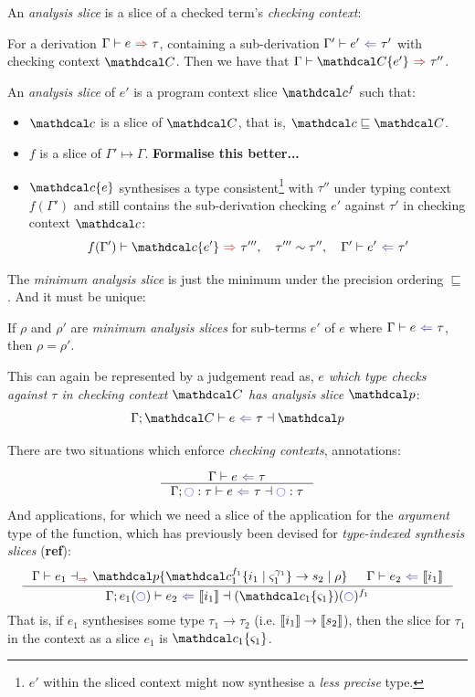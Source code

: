 An \textit{analysis slice} is a slice of a checked term's \textit{checking context}:
\begin{definition}\label{def:analysisslice}
For a derivation $\synthesis{e}{\tau}$, containing a sub-derivation $\analysis[\Gamma']{e'}{\tau'}$ with checking context $\C$. Then we have that $\synthesis[\Gamma]{\C\{e'\}}{\tau''}$. 

An \textit{analysis slice} of $e'$ is a program context slice $\Cs^f$ such that:
\begin{itemize}
\item $\Cs$ is a slice of $\C$, that is, $\Cs \sqsubseteq \C$.
\item $f$ is a slice of $\Gamma' \mapsto \Gamma$. \textbf{Formalise this better...}
\item $\Cs\{e\}$ synthesises a type consistent\footnote{$e'$ within the sliced context might now synthesise a \textit{less precise} type.} with $\tau''$ under typing context $f(\Gamma')$ and still contains the sub-derivation checking $e'$ against $\tau'$ in checking context $\Cs$:
\[\synthesis[f(\Gamma')]{\Cs\{e'\}}{\tau'''}, \quad \tau''' \sim \tau'', \quad \analysis[\Gamma']{e'}{\tau'}\]
\end{itemize}
\end{definition}

The \textit{minimum analysis slice} is just the minimum under the precision ordering $\sqsubseteq$. And it must be unique:

\begin{conjecture}[Uniqueness]\label{conj:AnalysisSliceUniqueness}
If $\rho$ and $\rho'$ are \textit{minimum analysis slices} for sub-terms $e'$ of $e$ where $\analysis{e}{\tau}$, then $\rho = \rho'$.
\end{conjecture}

This can again be represented by a judgement read as, \textit{$e$ which type checks against $\tau$ in checking context $\C$ has analysis slice $\p$}:
\[\analysisslice{\C}{e}{\tau}{\p}\]

There are two situations which enforce \textit{checking contexts}, annotations:

\[\inference{\analysis{e}{\tau}}{\analysisslice{\cmark : \tau}{e}{\tau}{\cmark : \tau}}\]
And applications, for which we need a slice of the application for the \textit{argument} type of the function, which has previously been devised for \textit{type-indexed synthesis slices} (\textbf{ref}):
\[\inference{\synthesissliceindexed{e_1}{\p\{\Cs_1^{f_1}\{i_1 \mid \varsigma_1^{\gamma_1}\} \to s_2 \mid \rho\}} & \analysis{e_2}{\type{i_1}}}{\analysisslice{e_1(\cmark)}{e_2}{\type{i_1}}{(\Cs_1\{\varsigma_1\})(\cmark)^{f_1}}}\]
That is, if $e_1$ synthesises some type $\tau_1 \to \tau_2$ (i.e. $\llbracket i_1 \rrbracket \to \llbracket s_2 \rrbracket$), then the slice for $\tau_1$ in the context as a slice $e_1$ is $\Cs_1\{\varsigma_1\}$.

